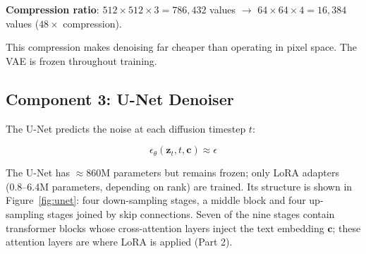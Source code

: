 \documentclass[11pt]{article}
\begin{document}
\textbf{Compression ratio}: $512 \times 512 \times 3 = 786{,}432$ values $\to$ $64 \times 64 \times 4 = 16{,}384$ values ($48\times$ compression).

This compression makes denoising far cheaper than operating in pixel space. The VAE is frozen throughout training.

\subsection{Component 3: U-Net Denoiser}

The U-Net predicts the noise at each diffusion timestep $t$:

\begin{equation}
\epsilon_{\theta}(\mathbf{z}_t, t, \mathbf{c}) \approx \epsilon
\end{equation}

The U-Net has $\approx 860$M parameters but remains frozen; only LoRA adapters (0.8--6.4M parameters, depending on rank) are trained. Its structure is shown in Figure~\ref{fig:unet}: four down-sampling stages, a middle block and four up-sampling stages joined by skip connections. Seven of the nine stages contain transformer blocks whose cross-attention layers inject the text embedding $\mathbf{c}$; these attention layers are where LoRA is applied (Part 2).
\end{document}
